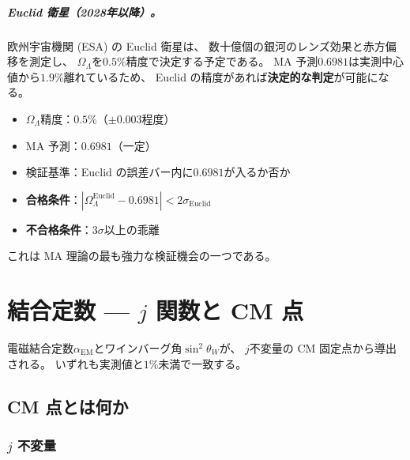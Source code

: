 \paragraph{Euclid 衛星（2028年以降）。}
欧州宇宙機関 (ESA) の Euclid 衛星は、
数十億個の銀河のレンズ効果と赤方偏移を測定し、
$\Omega_\Lambda$を$0.5\%$精度で決定する予定である。
MA 予測$0.6981$は実測中心値から$1.9\%$離れているため、
Euclid の精度があれば\textbf{決定的な判定}が可能になる。

\begin{experimentbox}
\begin{itemize}[nosep]
\item $\Omega_\Lambda$精度：$0.5\%$（$\pm 0.003$程度）
\item MA 予測：$0.6981$（一定）
\item 検証基準：Euclid の誤差バー内に$0.6981$が入るか否か
\item \textbf{合格条件}：$|\Omega_\Lambda^{\text{Euclid}} - 0.6981| < 2\sigma_{\text{Euclid}}$
\item \textbf{不合格条件}：$3\sigma$以上の乖離
\end{itemize}
これは MA 理論の最も強力な検証機会の一つである。
\end{experimentbox}


\chapter{結合定数 — $j$ 関数と CM 点}
\label{ch:coupling-constants}

\begin{statusbox}
電磁結合定数$\alpha_{\mathrm{EM}}$とワインバーグ角$\sin^2\theta_W$が、
$j$不変量の CM 固定点から導出される。
いずれも実測値と$1\%$未満で一致する。
\end{statusbox}

\section{CM 点とは何か}
\label{sec:CM-points}

\subsection{$j$ 不変量}


